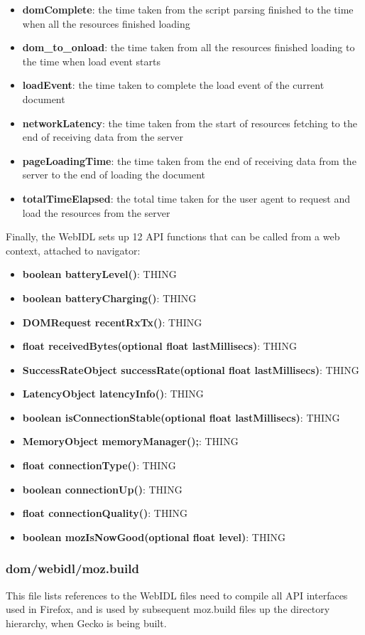 \documentclass[12pt]{article}
\begin{document}
\begin{itemize}
  \item \textbf{domComplete}: the time taken from the script parsing finished to the time when all the resources finished loading
  \item \textbf{dom\_to\_onload}: the time taken from all the resources finished loading to the time when load event starts
  \item \textbf{loadEvent}: the time taken to complete the load event of the current document
  \item \textbf{networkLatency}: the time taken from the start of resources fetching to the end of receiving data from the server
  \item \textbf{pageLoadingTime}: the time taken from the end of receiving data from the server to the end of loading the document
  \item \textbf{totalTimeElapsed}: the total time taken for the user agent to request and load the resources from the server
\end{itemize}

Finally, the WebIDL sets up 12 API functions that can be called from a web context, attached to navigator:
\begin{itemize}
  \item \textbf{boolean batteryLevel()}: THING
  \item \textbf{boolean batteryCharging()}: THING
  \item \textbf{DOMRequest recentRxTx()}: THING
  \item \textbf{float receivedBytes(optional float lastMillisecs)}: THING
  \item \textbf{SuccessRateObject successRate(optional float lastMillisecs)}: THING
  \item \textbf{LatencyObject latencyInfo()}: THING
  \item \textbf{boolean isConnectionStable(optional float lastMillisecs)}: THING
  \item \textbf{MemoryObject memoryManager();}: THING
  \item \textbf{float connectionType()}: THING
  \item \textbf{boolean connectionUp()}: THING
  \item \textbf{float connectionQuality()}: THING
  \item \textbf{boolean mozIsNowGood(optional float level)}: THING
\end{itemize}

\subsubsection{dom/webidl/moz.build}
This file lists references to the WebIDL files need to compile all API interfaces used in Firefox, and is used by subsequent moz.build files up the directory hierarchy, when Gecko is being built.
\end{document}
